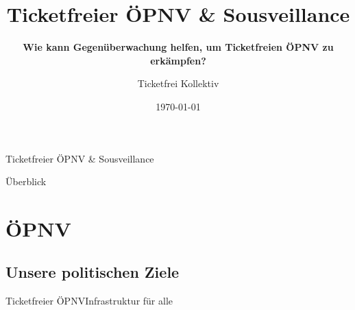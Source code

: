 \documentclass[10pt]{beamer}
\title[] %
{ %
      \textbf{Ticketfreier \"OPNV \& Sousveillance}
}
\subtitle[Ticketfreier \"OPNV \& Sousveillance]
{
      \textbf{Wie kann Gegenüberwachung helfen, um Ticketfreien ÖPNV zu erkämpfen?}
}
\author[Ticketfrei Kollektiv]
{      Ticketfrei Kollektiv \\
      {}
}
\institute[]
{
      Netzwerk für kybernetischen Anarchismus \& Sousveillance
  
}
\date{\today}
\begin{document}

{\1%



\begin{frame}{Ticketfreier \"OPNV \& Sousveillance}{}

\maketitle
\tableofcontents

\end{frame}

\begin{frame}{Überblick}{}

\tableofcontents

\end{frame}

\section{ÖPNV}
\subsection{Unsere politischen Ziele}
\begin{frame}{Ticketfreier ÖPNV}{Infrastruktur für alle}


\end{frame}}
\end{document}
